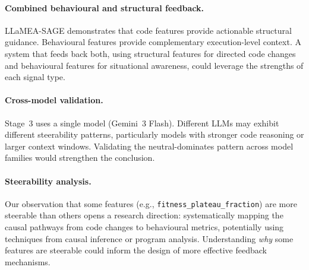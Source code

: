 \paragraph{Combined behavioural and structural feedback.}
LLaMEA-SAGE demonstrates that code features provide actionable structural guidance. Behavioural features provide complementary execution-level context. A system that feeds back both, using structural features for directed code changes and behavioural features for situational awareness, could leverage the strengths of each signal type.

\paragraph{Cross-model validation.}
Stage~3 uses a single model (Gemini~3 Flash). Different LLMs may exhibit different steerability patterns, particularly models with stronger code reasoning or larger context windows. Validating the neutral-dominates pattern across model families would strengthen the conclusion.

\paragraph{Steerability analysis.}
Our observation that some features (e.g., \texttt{fitness\_plateau\_fraction}) are more steerable than others opens a research direction: systematically mapping the causal pathways from code changes to behavioural metrics, potentially using techniques from causal inference or program analysis. Understanding \emph{why} some features are steerable could inform the design of more effective feedback mechanisms.
